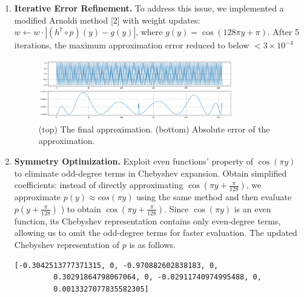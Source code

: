 \documentclass[article]{iacrtrans}
\begin{document}
\begin{enumerate}
\begin{figure}[H]
            \label{fig:parity-2}
        \end{figure}
    \item \textbf{Iterative Error Refinement.}
    To address this issue, we implemented a modified Arnoldi method [2] with weight updates: $w \leftarrow w \cdot |(h^7 \circ p)(y) - g(y)|$, where $g(y) = \cos(128\pi y + \pi)$. After 5 iterations, the maximum approximation error reduced to below $<3 \times 10^{-4}$ 
        \begin{figure}[H]
            \centering
            \includegraphics[width=0.8\textwidth]{parity_figures/parity_Figure_3.png}
            \caption{(top) The final approximation. (bottom) Absolute error of the approximation.}
            \label{fig:parity-3}
        \end{figure}
    \item \textbf{Symmetry Optimization.} Exploit even functions' property of $\cos(\pi y)$ to eliminate odd-degree terms in Chebyshev expansion. Obtain simplified coefficients:
    instead of directly approximating $\cos(\pi y + \frac{\pi}{128})$, we approximate $p(y)\approx cos(\pi y)$ using the same method and then evaluate $p(y + \frac{\pi}{128})$ ) to obtain $\cos(\pi y + \frac{\pi}{128})$. Since $\cos(\pi y )$ is an even function, its Chebyshev representation contains only even-degree terms, allowing us to omit the odd-degree terms for faster evaluation. The updated Chebyshev representation of $p$ is as follows.
        \begin{lstlisting}[breaklines=true, basicstyle=\ttfamily]
        [-0.3042513777371315, 0, -0.970882602838183, 0, 
         0.30291864798067064, 0, -0.02911740974995488, 0, 
         0.0013327077835582305]
        \end{lstlisting}


\end{enumerate}
\end{document}
